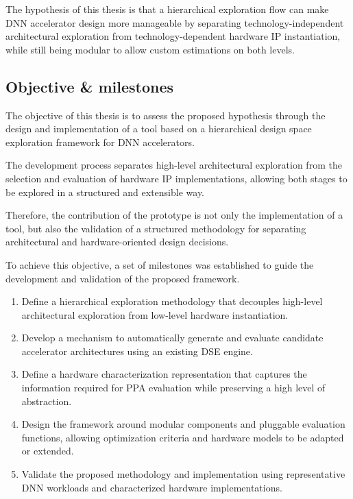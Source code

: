 The hypothesis of this thesis is that a hierarchical exploration flow
can make DNN accelerator
design more manageable by separating technology-independent
architectural exploration
from technology-dependent hardware IP instantiation,
while still being modular to allow custom estimations on both levels.

\subsection{Objective \& milestones}
\label{subsec:milestones}
The objective of this thesis is to assess the proposed hypothesis
through the design and implementation of a tool based on
a hierarchical design space exploration framework for DNN
accelerators.

The %
development process %
separates high-level architectural exploration from the selection
and evaluation of hardware IP implementations, allowing both stages
to be
explored in a structured and extensible way.


Therefore, the contribution of the prototype is not only the
implementation of a tool, but also
the validation of a structured methodology for separating
architectural
and hardware-oriented design decisions.

To achieve this objective, a set of milestones was established to guide the development and validation of the proposed framework.

\begin{enumerate}
    \renewcommand{\labelenumi}{M\arabic{enumi}.}
    \renewcommand{\theenumi}{M\arabic{enumi}}

    \item \label{milestone:m1}
    Define a hierarchical exploration methodology that
    decouples high-level architectural exploration from low-level
    hardware instantiation.

    \item \label{milestone:m2}
    Develop a mechanism to automatically generate and evaluate
    candidate accelerator architectures using an existing DSE engine.

    \item \label{milestone:m3}
    Define a hardware characterization representation that
    captures the information required for PPA evaluation while
    preserving a high level of abstraction.

    \item \label{milestone:m4}
    Design the framework around modular components and
    pluggable evaluation functions, allowing optimization criteria
    and hardware models to be adapted or extended.

    \item \label{milestone:m5}
    Validate the proposed methodology and implementation using
    representative DNN workloads and characterized hardware
    implementations.
\end{enumerate}


